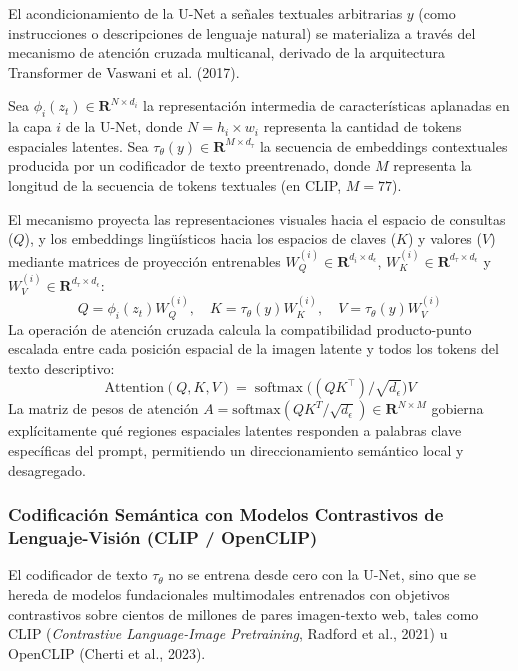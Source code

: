 El acondicionamiento de la U-Net a señales textuales arbitrarias $y$ (como instrucciones o descripciones de lenguaje natural) se materializa a través del mecanismo de atención cruzada multicanal, derivado de la arquitectura Transformer de Vaswani et al. (2017).

Sea $\phi_i(z_t) \in \mathbf{R}^{N \times d_i}$ la representación intermedia de características aplanadas en la capa $i$ de la U-Net, donde $N = h_i \times w_i$ representa la cantidad de tokens espaciales latentes. Sea $\tau_\theta(y) \in \mathbf{R}^{M \times d_\tau}$ la secuencia de embeddings contextuales producida por un codificador de texto preentrenado, donde $M$ representa la longitud de la secuencia de tokens textuales (en CLIP, $M=77$).

El mecanismo proyecta las representaciones visuales hacia el espacio de consultas ($Q$), y los embeddings lingüísticos hacia los espacios de claves ($K$) y valores ($V$) mediante matrices de proyección entrenables $W_Q^{(i)} \in \mathbf{R}^{d_i \times d_\epsilon}$, $W_K^{(i)} \in \mathbf{R}^{d_\tau \times d_\epsilon}$ y $W_V^{(i)} \in \mathbf{R}^{d_\tau \times d_\epsilon}$:
\begin{equation}
Q = \phi_i(z_t) W_Q^{(i)}, \quad K = \tau_\theta(y) W_K^{(i)}, \quad V = \tau_\theta(y) W_V^{(i)}
\end{equation}
La operación de atención cruzada calcula la compatibilidad producto-punto escalada entre cada posición espacial de la imagen latente y todos los tokens del texto descriptivo:
\begin{equation}
\mathrm{Attention}(Q, K, V) = \operatorname{softmax}\bigl( (Q K^\top) / \sqrt{d_\epsilon} \bigr) V
\end{equation}
La matriz de pesos de atención $A = \mathrm{softmax}(Q K^T / \sqrt{d_\epsilon}) \in \mathbf{R}^{N \times M}$ gobierna explícitamente qué regiones espaciales latentes responden a palabras clave específicas del prompt, permitiendo un direccionamiento semántico local y desagregado.

\subsubsection{Codificación Semántica con Modelos Contrastivos de Lenguaje-Visión (CLIP / OpenCLIP)}

El codificador de texto $\tau_\theta$ no se entrena desde cero con la U-Net, sino que se hereda de modelos fundacionales multimodales entrenados con objetivos contrastivos sobre cientos de millones de pares imagen-texto web, tales como CLIP (\textit{Contrastive Language-Image Pretraining}, Radford et al., 2021) u OpenCLIP (Cherti et al., 2023).

